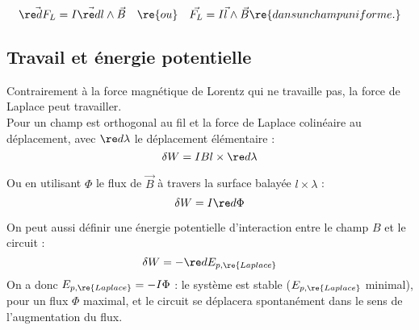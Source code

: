 \documentclass[13pt, twoside, a4paper, french]{report}
\begin{document}
            \[\vec{\re dF_L} = I \vec{\re dl} \wedge \vec B \quad \re{ou} \quad \vec{F_L} = I \vec l \wedge \vec B \re{ dans un champ uniforme.}\]
            
        
        \subsection{Travail et énergie potentielle}
            
            Contrairement à la force magnétique de Lorentz qui ne travaille pas, la force de Laplace peut travailler.\\
            Pour un champ est orthogonal au fil et la force de Laplace colinéaire au déplacement, avec $\re d \lambda$ le déplacement élémentaire :
            \[\delta W = I B l \times \re d \lambda\]
            
            Ou en utilisant $\Phi$ le flux de $\vec B$ à travers la surface balayée $l \times \lambda$ :
            \[\delta W = I \re d \Phi\]
            
            On peut aussi définir une énergie potentielle d’interaction entre le champ $B$ et le circuit :
            \[\delta W = - \re d E_{p,\re{Laplace}}\]
            On a donc $E_{p,\re{Laplace}} = - I \Phi$ : le système est stable ($E_{p,\re{Laplace}}$ minimal), pour un flux $\Phi$ maximal, et le circuit se déplacera spontanément dans le sens de l’augmentation du flux.
           

            
\end{document}
